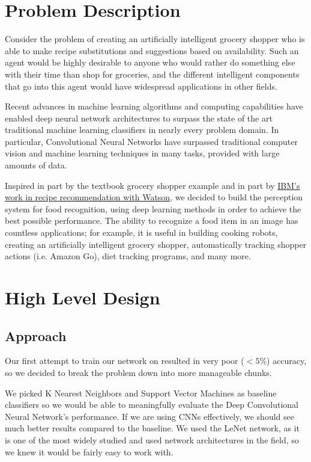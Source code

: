 \documentclass[leqno]{article}
\begin{document}
\section{Problem Description}
Consider the problem of creating an artificially intelligent grocery shopper who
is able to make recipe substitutions and suggestions based on availability. Such
an agent would be highly desirable to anyone who would rather do something else
with their time than shop for groceries, and the different intelligent
components that go into this agent would have widespread applications in other
fields.

Recent advances in machine learning algorithms and computing capabilities have
enabled deep neural network architectures to surpass the state of the art
traditional machine learning classifiers in nearly every problem domain. In
particular, Convolutional Neural Networks have surpassed traditional computer
vision and machine learning techniques in many tasks, provided with large
amounts of data.

Inspired in part by the textbook grocery shopper example and in part by
\href{https://www.wired.com/2014/06/how-ibms-watson-will-make-your-meals-tastier/}{IBM's
work in recipe recommendation with Watson}, we decided to build the perception
system for food recognition, using deep learning methods in order to achieve the best
possible performance. The ability to recognize a food item in an image has
countless applications; for example, it is useful
in building cooking robots, creating an artificially intelligent grocery
shopper, automatically tracking shopper actions (i.e. Amazon Go), diet tracking
programs, and many more.

\section{High Level Design}
\subsection{Approach}
Our first attempt to train our network on resulted in very poor ($<5\%$)
accuracy, so we decided to break the problem down into more manageable chunks.

We picked K Nearest Neighbors and Support Vector Machines as baseline classifiers 
so we would be able to meaningfully evaluate the Deep Convolutional Neural
Network's performance. If we are using CNNs effectively, we should see much
better results compared to the baseline. We used the LeNet network, as it is one
of the most widely studied and used network architectures in the
field, so we knew it would be fairly easy to work with.
\end{document}
